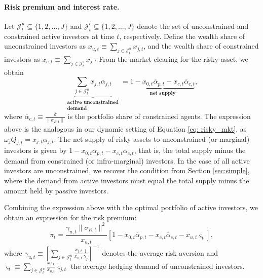 \paragraph{Risk premium and interest rate.} 
Let $\mathcal{J}_t^u \subseteq \{1,2,\ldots, J\}$ and $\mathcal{J}_t^c \subseteq \{1,2,\ldots, J\}$ denote the set of unconstrained and constrained active investors at time $t$, respectively.
Define the wealth share of unconstrained investors as $x_{u,t} \equiv \sum_{j\in \mathcal{J}_t^u} x_{j,t}$, and the wealth share of constrained investors as  $x_{c,t} \equiv \sum_{j\in \mathcal{J}_t^c} x_{j,t}$
From the market clearing for the risky asset, we obtain
\begin{equation}
    \underbrace{\sum_{j \in \mathcal{J}_t^u} x_{j,t} \alpha_{j,t} }_{\substack{\textbf{active unconstrained}\\
    \textbf{demand}}} = \underbrace{1 - x_{0,t} \overline{\alpha}_{p,t} - x_{c,t} \overline{\alpha}_{c,t} }_{\textbf{net supply}},
\end{equation}
where $\overline{\alpha}_{c,t} \equiv\frac{\overline{\sigma}}{\|\sigma_{R,t}\|}$ is the portfolio share of constrained agents. 
The expression above is the analogous in our dynamic setting of Equation \eqref{eq: risky_mkt}, as $\omega_j Q_{j,t} = x_{j,t} \alpha_{j,t}$.
The net supply of risky assets to unconstrained (or marginal) investors is given by $1 - x_{0,t} \overline{\alpha}_{p,t} - x_{c,t} \overline{\alpha}_{c,t}$, that is, the total supply minus the demand from constrained (or infra-marginal) investors.
In the case of all active investors are unconstrained, we recover the condition from Section \ref{sec:simple}, where the demand from active investors must equal the total supply minus the amount held by passive investors. 


Combining the expression above with the optimal portfolio of active investors, we obtain an expression for the risk premium:
\begin{equation}\label{eq:sharpe_ratio}
    \pi_{t} =  \frac{\gamma_{u,t} \|\sigma_{R,t}\|^2}{x_{u,t}} \left[ 1 - x_{0,t} \overline{\alpha}_{p,t} - x_{c,t} \overline{\alpha}_{c,t} - x_{u,t} \varsigma_{t} \right] ,
\end{equation}
where $\gamma_{u,t} \equiv \left[ \sum_{j\in\mathcal{J}_t^u} \frac{x_{j,t}}{x_{u,t}} \frac{1}{\gamma_j}\right]^{-1}$ denotes the average risk aversion and $\varsigma_t \equiv \sum_{j\in \mathcal{J}_t^u} \frac{x_{j,t}}{x_{u,t}} \varsigma_{j,t} $ the average hedging demand of unconstrained investors.

